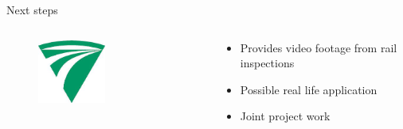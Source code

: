 \documentclass[aspectratio=169]{beamer}
\begin{document}
\begin{frame}{Next steps}
    \begin{columns}[T]
        \begin{column}{0.3\textwidth}
            \begin{figure}[H]
                \centering
                \includegraphics[width=0.5\textwidth]{./tex_images/mav_kfv_logo.jpeg}
            \end{figure}
        \end{column}
        \begin{column}{0.65\textwidth}
            \vspace*{0.5cm}
            \begin{itemize}
                \item Provides video footage from rail inspections
                \item Possible real life application
                \item Joint project work
            \end{itemize}
        \end{column}
    \end{columns}
\end{frame}
\end{document}
